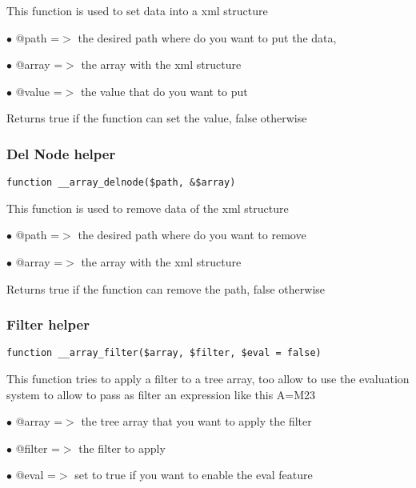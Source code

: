 \documentclass[a4paper]{article}
\begin{document}
This function is used to set data into a xml structure

\begin{compactitem}
\item[\color{myblue}$\bullet$] @path  =$>$ the desired path where do you want to put the data,
\item[\color{myblue}$\bullet$] @array =$>$ the array with the xml structure
\item[\color{myblue}$\bullet$] @value =$>$ the value that do you want to put
\end{compactitem}

Returns true if the function can set the value, false otherwise

\hypertarget{toc58}{}
\subsubsection{Del Node helper}

\begin{lstlisting}
function __array_delnode($path, &$array)
\end{lstlisting}

This function is used to remove data of the xml structure

\begin{compactitem}
\item[\color{myblue}$\bullet$] @path  =$>$ the desired path where do you want to remove
\item[\color{myblue}$\bullet$] @array =$>$ the array with the xml structure
\end{compactitem}

Returns true if the function can remove the path, false otherwise

\hypertarget{toc59}{}
\subsubsection{Filter helper}

\begin{lstlisting}
function __array_filter($array, $filter, $eval = false)
\end{lstlisting}

This function tries to apply a filter to a tree array, too allow to use
the evaluation system to allow to pass as filter an expression like this
A=M23

\begin{compactitem}
\item[\color{myblue}$\bullet$] @array  =$>$ the tree array that you want to apply the filter
\item[\color{myblue}$\bullet$] @filter =$>$ the filter to apply
\item[\color{myblue}$\bullet$] @eval   =$>$ set to true if you want to enable the eval feature
\end{compactitem}
\end{document}
